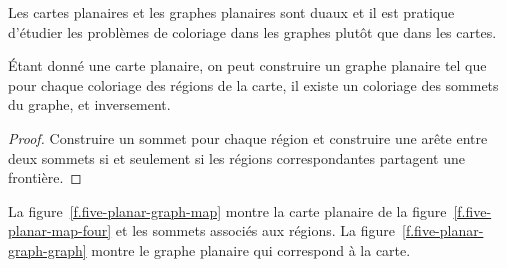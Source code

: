Les cartes planaires et les graphes planaires sont duaux et il est pratique d'étudier les problèmes de coloriage dans les graphes plutôt que dans les cartes.

\begin{theorem}
Étant donné une carte planaire, on peut construire un graphe planaire tel que pour chaque coloriage des régions de la carte, il existe un coloriage des sommets du graphe, et inversement.
\end{theorem}

\begin{proof}
Construire un sommet pour chaque région et construire une arête entre deux sommets si et seulement si les régions correspondantes partagent une frontière. 
\end{proof}

\begin{example}
La figure~\ref{f.five-planar-graph-map} montre la carte planaire de la figure~\ref{f.five-planar-map-four} et les sommets associés aux régions. La figure~\ref{f.five-planar-graph-graph} montre le graphe planaire qui correspond à la carte.
\end{example}

\vspace{0.4cm}

